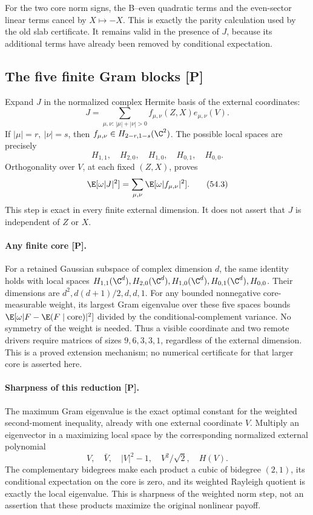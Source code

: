 For the two core norm signs, the B--even quadratic terms and
the even-sector linear terms cancel by \(X\mapsto-X\).
This is exactly the parity calculation used by the old slab certificate.
It remains valid in the presence of \(J\), because its additional
terms have already been removed by conditional expectation.

\subsection{The five finite Gram blocks [P]}
Expand \(J\) in the normalized complex Hermite basis of the external
coordinates:
\[
 J=\sum_{\mu,\nu:\,|\mu|+|\nu|>0}
       f_{\mu,\nu}(Z,X)e_{\mu,\nu}(V).
\]
If \(|\mu|=r,\ |\nu|=s\), then
\(f_{\mu,\nu}\in H_{2-r,1-s}(\C^2)\).
The possible local spaces are precisely
\[
 H_{1,1},\quad H_{2,0},\quad H_{1,0},\quad
 H_{0,1},\quad H_{0,0}.
 \tag{54.2}
\]
Orthogonality over \(V\), at each fixed \((Z,X)\), proves
\[
 \E[\omega|J|^2]
 =\sum_{\mu,\nu}\E[\omega|f_{\mu,\nu}|^2].
 \tag{54.3}
\]
This step is exact in every finite external dimension.
It does not assert that \(J\) is independent of \(Z\) or \(X\).

\paragraph{Any finite core [P].}
For a retained Gaussian subspace of complex dimension \(d\), the same
identity holds with local spaces
\(H_{1,1}(\C^d),H_{2,0}(\C^d),H_{1,0}(\C^d),H_{0,1}(\C^d),H_{0,0}\).
Their dimensions are \(d^2,d(d+1)/2,d,d,1\).
For any bounded nonnegative core-measurable weight, its largest
Gram eigenvalue over these five spaces bounds
\(\E[\omega|F-\E(F\mid\mathrm{core})|^2]\) divided by the
conditional-complement variance. No symmetry of the weight is needed.
Thus a visible coordinate and two remote drivers require matrices
of sizes \(9,6,3,3,1\), regardless of the external dimension.
This is a proved extension mechanism; no numerical certificate
for that larger core is asserted here.

\paragraph{Sharpness of this reduction [P].}
The maximum Gram eigenvalue is the exact optimal constant for
the weighted second-moment inequality, already with one external
coordinate \(V\). Multiply an eigenvector in a maximizing local space
by the corresponding normalized external polynomial
\[
 V,\quad\bar V,\quad |V|^2-1,\quad V^2/\sqrt2,\quad H(V).
\]
The complementary bidegrees make each product a cubic of bidegree
\((2,1)\), its conditional expectation on the core is zero, and
its weighted Rayleigh quotient is exactly the local eigenvalue.
This is sharpness of the weighted norm step, not an assertion
that these products maximize the original nonlinear payoff.

